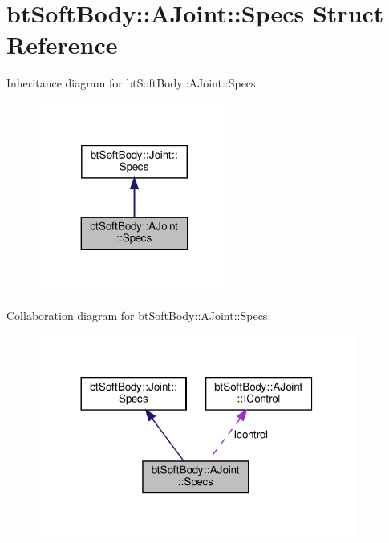 \hypertarget{structbtSoftBody_1_1AJoint_1_1Specs}{}\section{bt\+Soft\+Body\+:\+:A\+Joint\+:\+:Specs Struct Reference}
\label{structbtSoftBody_1_1AJoint_1_1Specs}


Inheritance diagram for bt\+Soft\+Body\+:\+:A\+Joint\+:\+:Specs\+:
\nopagebreak
\begin{figure}[H]
\begin{center}
\leavevmode
\includegraphics[width=179pt]{structbtSoftBody_1_1AJoint_1_1Specs__inherit__graph}
\end{center}
\end{figure}


Collaboration diagram for bt\+Soft\+Body\+:\+:A\+Joint\+:\+:Specs\+:
\nopagebreak
\begin{figure}[H]
\begin{center}
\leavevmode
\includegraphics[width=296pt]{structbtSoftBody_1_1AJoint_1_1Specs__coll__graph}
\end{center}
\end{figure}
